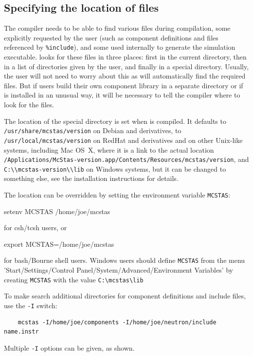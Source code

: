 \subsection{Specifying the location of files}
\label{s:files}

The \MCS compiler \mcs
needs to be able to find various files during compilation,
some explicitly requested by the user (such as component definitions and files
referenced by \verb+%include+), 
and some used internally to generate the simulation executable.
\MCS looks for
these files in three places: first in the current directory, then in a list of
directories given by the user, and finally in a special \MCS directory.
Usually, the user will not need to worry about this as \mcs will
automatically find the required files. But if users build their own component
library in a separate directory or if \mcs is installed in an unusual way, it
will be necessary to tell the compiler where to look for the files.

The location of the special \MCS directory is set
when \mcs is compiled.
It defaults to \nolinkurl{/usr/share/mcstas/version} on Debian and derivatives,
to \nolinkurl{/usr/local/mcstas/version} on RedHat and derivatives
and on other Unix-like systems, including Mac OS~X,
where it is a link to the actual location
\nolinkurl{/Applications/McStas-version.app/Contents/Resources/mcstas/version},
and \nolinkurl{C:\\mcstas-version\\lib} on Windows systems,
but it can be changed to something else,
see the installation instructions for details.

The location can be
overridden by setting the environment variable \verb+MCSTAS+:
\begin{bash}
    setenv MCSTAS /home/joe/mcstas
\end{bash}
for csh/tcsh users, or
\begin{bash}
    export MCSTAS=/home/joe/mcstas
\end{bash}
for bash/Bourne shell users.  Windows users should define
\verb+MCSTAS+ from the menu 'Start/Settings/Control
Panel/System/Advanced/Environment Variables' by creating \verb+MCSTAS+ with the
value \verb+C:\mcstas\lib+

To make \mcs search additional directories for component definitions
and include files, use the \verb+-I+ switch:
\begin{lstlisting}
    mcstas -I/home/joe/components -I/home/joe/neutron/include name.instr
\end{lstlisting}
Multiple \verb+-I+ options can be given, as shown.

